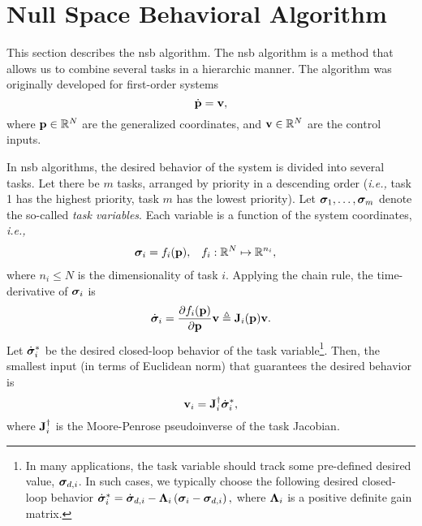 \section{Null Space Behavioral Algorithm}
\label{sec:background_NSB}

This section describes the \gls{nsb} algorithm.
The \gls{nsb} algorithm is a method that allows us to combine several tasks in a hierarchic manner.
The algorithm was originally developed for first-order systems
\begin{equation}
    \dot{\mathbf{p}} = \mathbf{v},
\end{equation}
where $\mathbf{p} \in \mathbb{R}^N$ are the generalized coordinates, and $\mathbf{v} \in \mathbb{R}^N$ are the control inputs.

In \gls{nsb} algorithms, the desired behavior of the system is divided into several tasks.
Let there be $m$ tasks, arranged by priority in a descending order (\emph{i.e.,} task 1 has the highest priority, task $m$ has the lowest priority).
Let $\bm{\sigma}_1, \ldots, \bm{\sigma}_m$ denote the so-called \emph{task variables}.
Each variable is a function of the system coordinates, \emph{i.e.,}
\begin{align}
    \bm{\sigma}_i &= f_i(\mathbf{p}), &
    f_i &: \mathbb{R}^N \mapsto \mathbb{R}^{n_i},
\end{align}
where $n_i \leq N$ is the dimensionality of task $i$.
Applying the chain rule, the time-derivative of $\bm{\sigma}_i$ is
\begin{equation}
    \dot{\bm{\sigma}}_i = \frac{\partial f_i(\mathbf{p})}{\partial \mathbf{p}} \mathbf{v} \triangleq \mathbf{J}_i(\mathbf{p}) \mathbf{v}.
\end{equation}
Let $\dot{\bm{\sigma}}_i^{*}$ be the desired closed-loop behavior of the task variable\footnote{
In many applications, the task variable should track some pre-defined desired value, $\bm{\sigma}_{d, i}$.
In such cases, we typically choose the following desired closed-loop behavior
$
    \dot{\bm{\sigma}}_i^{*} = \dot{\bm{\sigma}}_{d, i} - \bm{\Lambda}_i \left(\bm{\sigma}_i - \bm{\sigma}_{d,i}\right),    
$
where $\bm{\Lambda}_i$ is a positive definite gain matrix.
}.
Then, the smallest input (in terms of Euclidean norm) that guarantees the desired behavior is
\begin{equation}
    \mathbf{v}_i = \mathbf{J}_i^{\dagger} \dot{\bm{\sigma}}_i^{*},
    \label{eq:background_NSB_velocity_i}
\end{equation}
where $\mathbf{J}_i^{\dagger}$ is the Moore-Penrose pseudoinverse of the task Jacobian.

